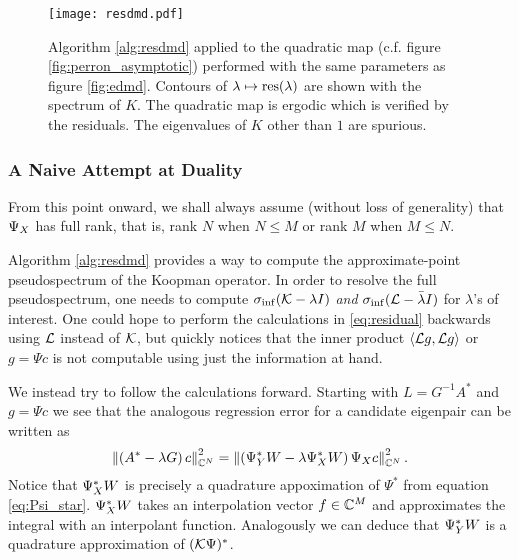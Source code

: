 \begin{figure}
    \centering
    \texttt{[image: resdmd.pdf]}
    \caption{
        Algorithm \ref{alg:resdmd} applied to the quadratic map (c.f. figure 
        \ref{fig:perron_asymptotic}) performed with the same parameters as 
        figure \ref{fig:edmd}. Contours of $\lambda \mapsto \text{res} (\lambda)$ are shown with 
        the spectrum of $K$. The quadratic map is ergodic \cite{logisitc_ergodic} 
        which is verified by the residuals. The eigenvalues of $K$ other than $1$ 
        are spurious. 
    }\label{fig:resdmd}
\end{figure}


\subsubsection{A Naive Attempt at Duality}

From this point onward, we shall always assume (without loss of generality) that $\Psi_X$ has 
full rank, that is, rank $N$ when $N \leq M$ or rank $M$ when $M \leq N$. 

Algorithm \ref{alg:resdmd} provides a way to compute the approximate-point pseudospectrum 
of the Koopman operator. In order to resolve the full pseudospectrum, one needs to compute 
$\sigma_{\inf} (\mathcal{K} - \lambda I)$ \emph{and} $\sigma_{\inf} (\mathcal{L} - \bar{\lambda} I)$ 
for $\lambda$'s of interest. One could hope to perform the calculations in \ref{eq:residual} 
backwards using $\mathcal{L}$ instead of $\mathcal{K}$, but quickly notices that the inner product 
$\left\langle \mathcal{L} g, \mathcal{L} g \right\rangle$ or $g = \Psi c$ is not computable using just 
the information at hand. 

We instead try to follow the calculations forward. Starting with $L = G^{-1} A^*$ 
and $g = \Psi c$ we see that the analogous regression error for a candidate eigenpair can 
be written as 
\begin{equation}
    \left\| \left( A^* - \lambda G \right) c \right\|_{\mathbb{C}^N}^2 
    = \left\| \left( \Psi_Y^* W - \lambda \Psi_X^* W \right) \Psi_X c \right\|_{\mathbb{C}^N}^2 . 
\end{equation}
Notice that $\Psi_X^* W$ is precisely a quadrature appoximation of $\Psi^*$ from equation 
\ref{eq:Psi_star}. $\Psi_X^* W$ takes an interpolation vector $f \in \mathbb{C}^M$ and 
approximates the integral with an interpolant function. Analogously we can deduce that 
$\Psi_Y^* W$ is a quadrature approximation of $(\mathcal{K} \Psi)^*$. 

